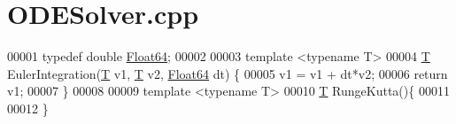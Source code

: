 \hypertarget{_o_d_e_solver_8cpp_source}{}\section{O\+D\+E\+Solver.\+cpp}
\label{_o_d_e_solver_8cpp_source}

\begin{DoxyCode}
00001 \textcolor{keyword}{typedef} \textcolor{keywordtype}{double} \hyperlink{group___tools_ga3f1431cb9f76da10f59246d1d743dc2c}{Float64};
00002 
00003 \textcolor{keyword}{template} <\textcolor{keyword}{typename} T>
00004 \hyperlink{group___sparse_core___module_class_eigen_1_1_triplet}{T} EulerIntegration(\hyperlink{group___sparse_core___module_class_eigen_1_1_triplet}{T} v1, \hyperlink{group___sparse_core___module_class_eigen_1_1_triplet}{T} v2, \hyperlink{group___tools_ga3f1431cb9f76da10f59246d1d743dc2c}{Float64} dt) \{
00005     v1 = v1 + dt*v2;
00006     \textcolor{keywordflow}{return} v1;
00007 \}
00008 
00009 \textcolor{keyword}{template} <\textcolor{keyword}{typename} T>
00010 \hyperlink{group___sparse_core___module_class_eigen_1_1_triplet}{T} RungeKutta()\{
00011 
00012 \}
\end{DoxyCode}
